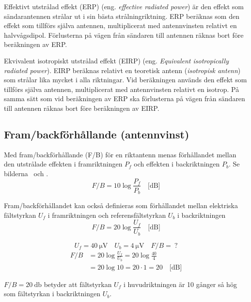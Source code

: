 Effektivt utstrålad effekt (ERP) (eng. \emph{effective radiated power}) är den
effekt som sändarantennen strålar ut i sin bästa strålningriktning.
ERP beräknas som den effekt som tillförs själva antennen, multiplicerat med
antennvinsten relativt en halvvågsdipol.
Förlusterna på vägen från sändaren till antennen räknas bort före beräkningen av
ERP.

Ekvivalent isotropiskt utstrålad effekt (EIRP)
(eng. \emph{Equivalent isotropically radiated power}).
EIRP beräknas relativt en teoretisk antenn (\emph{isotropisk antenn}) som
strålar lika mycket i alla riktningar.
Vid beräkningen används den effekt som tillförs själva antennen, multiplicerat
med antennvinsten relativt en isotrop.
På samma sätt som vid beräkningen av ERP ska förlusterna på vägen från sändaren
till antennen räknas bort före beräkningen av EIRP.

\subsection{Fram/backförhållande (antennvinst)}

Med fram/backförhållande (F/B) för en riktantenn menas förhållandet mellan den
utstrålade effekten i framriktningen \(P_f\) och effekten i backriktningen
\(P_b\). Se bilderna~ och .
\[ F/B = 10 \log\frac{P_f}{P_b} \quad \text{[dB]} \]

Fram/backförhållandet kan också definieras som förhållandet mellan elektriska
fältstyrkan \(U_f\) i framriktningen och referensfältstyrkan \(U_b\) i
backriktningen
\[ F/B = 20 \log\frac{U_f}{U_b} \quad \text{[dB]} \]

\begin{exempelbox}
\noindent
\[ U_f = \qty{40}{\micro\volt} \quad U_b = \qty{4}{\micro\volt} \quad F/B =\ ? \]
\tcblower
\noindent
\begin{align*}
  F/B &= 20 \log\frac{U_f}{U_b} = 20 \log\frac{40}{4} \\
  &= 20 \log 10 = 20 \cdot 1 = 20 \quad \text{[dB]}
\end{align*}

\(F/B = \qty{20}{\decibel}\) betyder att fältstyrkan \(U_f\) i huvudriktningen är
10 gånger så hög som fältstyrkan i backriktningen \(U_b\).
\end{exempelbox}

